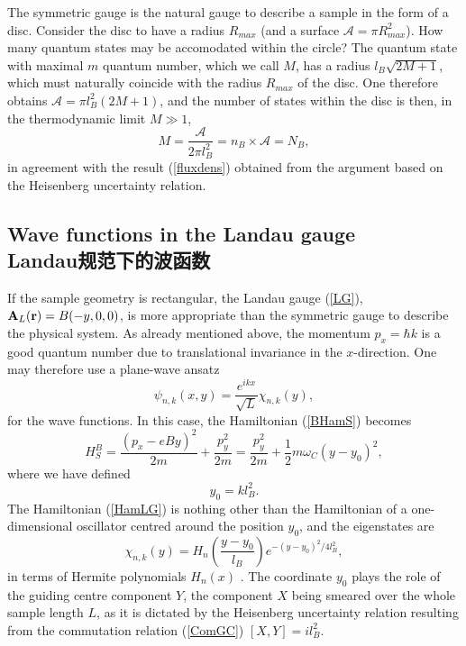 \documentclass[10pt]{book}
\newcommand{\br}{{\bf r}}
\newcommand{\bA}{{\bf A}}
\newcommand{\Amath}{\mathcal{A}}
\newcommand{\beq}{\begin{equation}}
\newcommand{\eeq}{\end{equation}}
\begin{document}
The symmetric gauge is the natural gauge to describe 
a sample in the form of a disc. Consider the disc to have a radius $R_{max}$
(and a surface $\Amath=\pi R_{max}^2$). How many quantum states may be accomodated within the circle? The quantum state with 
maximal $m$ quantum number, which we call $M$, has a radius $l_B\sqrt{2M+1}$, which must naturally coincide with the 
radius $R_{max}$ of the disc. One therefore obtains $\Amath = \pi l_B^2(2M+1)$, and the number of states within the disc is then,
in the thermodynamic limit $M\gg 1$,
\beq\label{NBsym}
M=\frac{\Amath}{2\pi l_B^2}= n_B\times \Amath=N_B, \eeq
in agreement with the result (\ref{fluxdens}) obtained from the argument based on the Heisenberg uncertainty relation. 





\subsection[Landau规范下的波函数]{Wave functions in the Landau gauge\\\bf Landau规范下的波函数}
\label{WFLandau}

If the sample geometry is rectangular, the Landau gauge (\ref{LG}), $\bA_L(\br)=B(-y,0,0)$, is more appropriate than
the symmetric gauge to describe the physical system. As already mentioned above, the momentum $p_x=\hbar k$ 
is a good quantum number due to translational invariance in the $x$-direction. One may therefore use a plane-wave
ansatz 
$$\psi_{n,k}(x,y) = \frac{e^{ikx}}{\sqrt{L}}\chi_{n,k}(y),
$$
for the wave functions. In this case, the Hamiltonian (\ref{BHamS}) becomes
\beq\label{HamLG}
H_S^B= \frac{(p_x- eBy)^2}{2m} + \frac{p_y^2}{2m} = \frac{p_y^2}{2m} + \frac{1}{2} m\omega_C (y-y_0)^2,
\eeq
where we have defined 
\beq\label{GCk}
y_0 = kl_B^2.
\eeq
The Hamiltonian (\ref{HamLG}) is nothing other than the Hamiltonian of a one-dimensional oscillator centred around the 
position $y_0$, and the eigenstates are 
$$\chi_{n,k}(y)=H_n\left(\frac{y-y_0}{l_B}\right)e^{-(y-y_0)^2/4l_B^2},$$
in terms of Hermite polynomials $H_n(x)$ \cite{CT}. The coordinate $y_0$ plays the role of the guiding centre component $Y$, 
the component $X$ being smeared over the whole sample
length $L$, as it is dictated by the Heisenberg uncertainty relation resulting from the commutation relation (\ref{ComGC})
$[X,Y]=il_B^2$.
\end{document}
